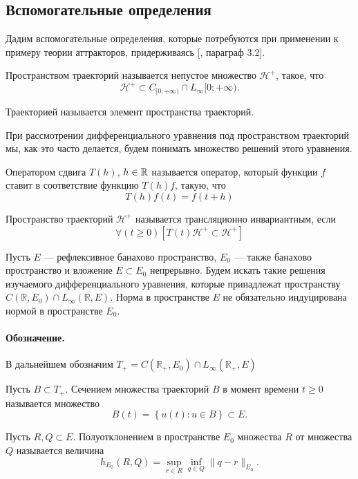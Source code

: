 \subsection*{Вспомогательные определения}

Дадим вспомогательные определения, которые потребуются при применении к примеру теории аттракторов,
придерживаясь [\cite{Zelenaya}, параграф 3.2].


\opred
Пространством траекторий называется непустое множество $\mathcal{H}^+$, такое, что
$$
	\mathcal{H}^+ \subset C_{[0;+\infty)} \cap L_\infty{[0;+\infty)}.
$$

\opred
Траекторией называется элемент пространства траекторий.

При рассмотрении дифференциального уравнения под пространством траекторий мы, как это часто делается,
будем понимать множество решений этого уравнения.


\opred
Оператором сдвига $T(h)$, $h\in\mathbb{R}$ называется оператор, который функции $f$ ставит в соответствие функцию $T(h)f$, такую, что
$$
T(h)f(t)=f(t+h)
$$


\opred
Пространство траекторий $\mathcal{H}^+$ называется трансляционно инвариантным, если
$$
\forall(t \geq 0)\left[T(t)\mathcal{H}^+ \subset \mathcal{H}^+ \right]
$$


Пусть $E$ --- рефлексивное банахово пространство, $E_0$ --- также банахово пространство и вложение $E \subset E_0$ непрерывно.
Будем искать такие решения изучаемого дифференциального уравнения,
которые принадлежат пространству $C(\mathbb{R},E_0) \cap L_\infty(\mathbb{R},E)$.
Норма в пространстве $E$ не обязательно индуцирована нормой в пространстве $E_0$.

\paragraph{Обозначение.}
В дальнейшем обозначим $T_+ = C(\mathbb{R}_+,E_0) \cap L_\infty(\mathbb{R}_+,E)$




\opred

Пусть $B \subset T_+$.
Сечением множества траекторий $B$ в момент времени $t \geq 0$ называется множество
$$
	B(t)=\left\{u(t) : u \in B \right\} \subset E.
$$


\opred

Пусть $R,Q \subset E$.
Полуотклонением в пространстве $E_0$ множества $R$ от множества $Q$ называется величина
$$
	h_{E_0}(R,Q) = \sup_{r\in R} \inf_{q \in Q} \| q - r \|_{E_0}.
$$

